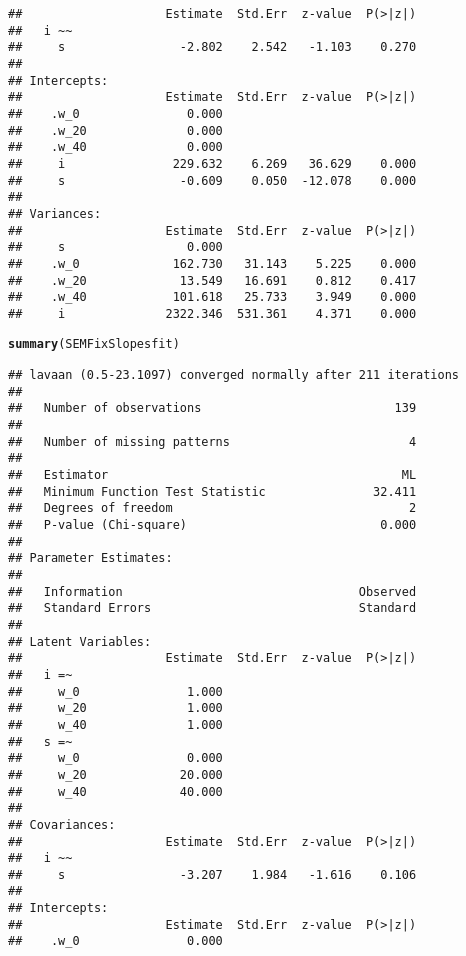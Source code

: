 \documentclass{article}\usepackage[]{graphicx}\usepackage[]{color}
\makeatletter
\newcommand{\hlstd}[1]{\textcolor[rgb]{0.345,0.345,0.345}{#1}}%
\newcommand{\hlkwd}[1]{\textcolor[rgb]{0.737,0.353,0.396}{\textbf{#1}}}%
\newenvironment{kframe}{%
 \def\at@end@of@kframe{}%
 \ifinner\ifhmode%
  \def\at@end@of@kframe{\end{minipage}}%
  \begin{minipage}{\columnwidth}%
 \fi\fi%
 \def\FrameCommand##1{\hskip\@totalleftmargin \hskip-\fboxsep
 \colorbox{shadecolor}{##1}\hskip-\fboxsep
     \hskip-\linewidth \hskip-\@totalleftmargin \hskip\columnwidth}%
 \MakeFramed {\advance\hsize-\width
   \@totalleftmargin\z@ \linewidth\hsize
   \@setminipage}}%
 {\par\unskip\endMakeFramed%
 \at@end@of@kframe}
\newenvironment{knitrout}{}{} %
\makeatother
\begin{document}
\begin{knitrout}
\begin{kframe}
\begin{verbatim}
##                    Estimate  Std.Err  z-value  P(>|z|)
##   i ~~                                                
##     s                -2.802    2.542   -1.103    0.270
## 
## Intercepts:
##                    Estimate  Std.Err  z-value  P(>|z|)
##    .w_0               0.000                           
##    .w_20              0.000                           
##    .w_40              0.000                           
##     i               229.632    6.269   36.629    0.000
##     s                -0.609    0.050  -12.078    0.000
## 
## Variances:
##                    Estimate  Std.Err  z-value  P(>|z|)
##     s                 0.000                           
##    .w_0             162.730   31.143    5.225    0.000
##    .w_20             13.549   16.691    0.812    0.417
##    .w_40            101.618   25.733    3.949    0.000
##     i              2322.346  531.361    4.371    0.000
\end{verbatim}
\begin{alltt}
\hlkwd{summary}\hlstd{(SEMFixSlopesfit)}
\end{alltt}
\begin{verbatim}
## lavaan (0.5-23.1097) converged normally after 211 iterations
## 
##   Number of observations                           139
## 
##   Number of missing patterns                         4
## 
##   Estimator                                         ML
##   Minimum Function Test Statistic               32.411
##   Degrees of freedom                                 2
##   P-value (Chi-square)                           0.000
## 
## Parameter Estimates:
## 
##   Information                                 Observed
##   Standard Errors                             Standard
## 
## Latent Variables:
##                    Estimate  Std.Err  z-value  P(>|z|)
##   i =~                                                
##     w_0               1.000                           
##     w_20              1.000                           
##     w_40              1.000                           
##   s =~                                                
##     w_0               0.000                           
##     w_20             20.000                           
##     w_40             40.000                           
## 
## Covariances:
##                    Estimate  Std.Err  z-value  P(>|z|)
##   i ~~                                                
##     s                -3.207    1.984   -1.616    0.106
## 
## Intercepts:
##                    Estimate  Std.Err  z-value  P(>|z|)
##    .w_0               0.000                           

\end{verbatim}
\end{kframe}
\end{knitrout}
\end{document}
